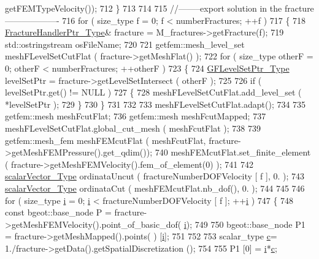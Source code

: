 \begin{DoxyCode}
      getFEMTypeVelocity());
712     \}
713 
714 
715     \textcolor{comment}{//--------export solution in the fracture-------------------}
716     \textcolor{keywordflow}{for} ( size\_type f = 0; f < numberFractures; ++f )
717     \{
718         \hyperlink{FractureHandler_8h_af23fb7a30aaff864bd42587af4f1e78a}{FractureHandlerPtr\_Type}& fracture = M\_fractures->getFracture(f);
719         std::ostringstream osFileName;
720 
721         getfem::mesh\_level\_set meshFLevelSetCutFlat ( fracture->getMeshFlat() );
722         \textcolor{keywordflow}{for} ( size\_type otherF = 0; otherF < numberFractures; ++otherF )
723         \{
724             \hyperlink{Core_8h_a036173458a8a25c7c03f8c76d97e9580}{GFLevelSetPtr\_Type} levelSetPtr = fracture->getLevelSetIntersect ( otherF );
725 
726             \textcolor{keywordflow}{if} ( levelSetPtr.get() != NULL )
727             \{
728                 meshFLevelSetCutFlat.add\_level\_set ( *levelSetPtr );
729             \}
730         \}
731 
732 
733         meshFLevelSetCutFlat.adapt();
734 
735         getfem::mesh meshFcutFlat;
736         getfem::mesh meshFcutMapped;
737         meshFLevelSetCutFlat.global\_cut\_mesh ( meshFcutFlat );
738 
739         getfem::mesh\_fem meshFEMcutFlat ( meshFcutFlat, fracture->getMeshFEMPressure().get\_qdim());
740         meshFEMcutFlat.set\_finite\_element ( fracture->getMeshFEMVelocity().fem\_of\_element(0) );
741 
742         \hyperlink{Core_8h_a4e75b5863535ba1dd79942de2846eff0}{scalarVector\_Type} ordinataUncut ( fractureNumberDOFVelocity [ f ], 0. );
743         \hyperlink{Core_8h_a4e75b5863535ba1dd79942de2846eff0}{scalarVector\_Type} ordinataCut ( meshFEMcutFlat.nb\_dof(), 0. );
744 
745     
746         \textcolor{keywordflow}{for} ( size\_type \hyperlink{matrici_8m_a6f6ccfcf58b31cb6412107d9d5281426}{i} = 0; \hyperlink{matrici_8m_a6f6ccfcf58b31cb6412107d9d5281426}{i} < fractureNumberDOFVelocity [ f ]; ++\hyperlink{matrici_8m_a6f6ccfcf58b31cb6412107d9d5281426}{i} )
747         \{
748             \textcolor{keyword}{const} bgeot::base\_node P = fracture->getMeshFEMVelocity().point\_of\_basic\_dof(
      \hyperlink{matrici_8m_a6f6ccfcf58b31cb6412107d9d5281426}{i});
749 
750             bgeot::base\_node P1 = fracture->getMeshMapped().points( ) [\hyperlink{matrici_8m_a6f6ccfcf58b31cb6412107d9d5281426}{i}];
751 
752 
753             scalar\_type \hyperlink{matrici_8m_ae0323a9039add2978bf5b49550572c7c}{c}= 1./fracture->getData().getSpatialDiscretization ();
754 
755             P1 [0] =  \hyperlink{matrici_8m_a6f6ccfcf58b31cb6412107d9d5281426}{i}*\hyperlink{matrici_8m_ae0323a9039add2978bf5b49550572c7c}{c};

\end{DoxyCode}
